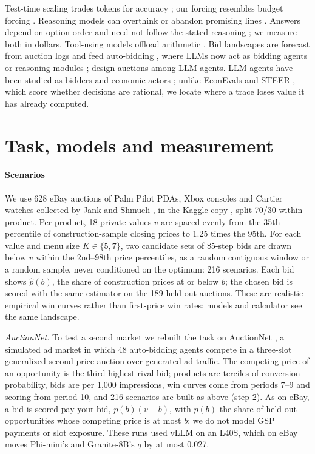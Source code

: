 \documentclass[sigconf,review,anonymous]{acmart}
\begin{document}
Test-time scaling trades tokens for accuracy \cite{wei2022chain,snell2024scaling}; our forcing resembles budget forcing \cite{muennighoff2025s1}. Reasoning models can overthink \cite{chen2024overthinking} or abandon promising lines \cite{wang2025underthinking}. Answers depend on option order \cite{zheng2024mcq,pezeshkpour2024order} and need not follow the stated reasoning \cite{turpin2023unfaithful,lanham2023faithfulness,chen2025reasoningsay}; we measure both in dollars. Tool-using models offload arithmetic \cite{schick2023toolformer}. Bid landscapes are forecast from auction logs \cite{cui2011bidlandscape} and feed auto-bidding \cite{aggarwal2024autobidding}, where LLMs now act as bidding agents \cite{cai2025rtbagent} or reasoning modules \cite{li2026lbm}; \citet{duetting2024mechanism} design auctions among LLM agents. LLM agents have been studied as bidders and economic actors \cite{chen2024aucarena,zhu2024synthetic,ahmed2026bazaar,raman2024steer,fish2025econevals}; unlike EconEvals \cite{fish2025econevals} and STEER \cite{raman2024steer}, which score whether decisions are rational, we locate where a trace loses value it has already computed.

\section{Task, models and measurement}

\paragraph{Scenarios}
We use 628 eBay auctions of Palm Pilot PDAs, Xbox consoles and Cartier watches collected by Jank and Shmueli \cite{jank2010modeling}, in the Kaggle copy \cite{onlineauctionsdataset}, split 70/30 within product. Per product, 18 private values $v$ are spaced evenly from the 35th percentile of construction-sample closing prices to 1.25 times the 95th. For each value and menu size $K\in\{5,7\}$, two candidate sets of \$5-step bids are drawn below $v$ within the 2nd--98th price percentiles, as a random contiguous window or a random sample, never conditioned on the optimum: 216 scenarios. Each bid shows $\hat p(b)$, the share of construction prices at or below $b$; the chosen bid is scored with the same estimator on the 189 held-out auctions. These are realistic empirical win curves rather than first-price win rates; models and calculator see the same landscape.

\emph{AuctionNet.} To test a second market we rebuilt the task on AuctionNet \cite{su2024auctionnet}, a simulated ad market in which 48 auto-bidding agents compete in a three-slot generalized second-price auction over generated ad traffic. The competing price of an opportunity is the third-highest rival bid; products are terciles of conversion probability, bids are per 1{,}000 impressions, win curves come from periods 7--9 and scoring from period 10, and 216 scenarios are built as above (step 2). As on eBay, a bid is scored pay-your-bid, $p(b)(v-b)$, with $p(b)$ the share of held-out opportunities whose competing price is at most $b$; we do not model GSP payments or slot exposure. These runs used vLLM on an L40S, which on eBay moves Phi-mini's and Granite-8B's $q$ by at most 0.027.
\end{document}
